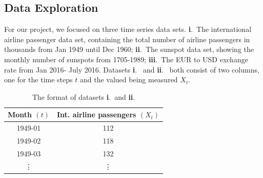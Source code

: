 \documentclass[10pt,a4paper]{article}
\begin{document}
\subsection{Data Exploration}
%
For our project, we focused on three time series data sets. {\bf i}.~The international airline passenger data set, containing the total number of airline passengers in thousands from Jan 1949 until Dec 1960; {\bf ii}.~The sunspot data set, showing the monthly number of sunspots from 1705-1989; {\bf iii}.~The EUR to USD exchange rate from Jan 2016- July 2016. Datasets {\bf i}.~ and {\bf ii}.~ both consist of two columns, one for the time steps $t$ and the valued being measured $X_t$. 

\begin{table}[h]
\centering
\begin{tabular}{ c c }
Month $(t)$ & Int. airline passengers $(X_t)$ \\ \hline
 1949-01 & 112 \\ 
 1949-02 & 118  \\  
 1949-03 & 132   \\
 \vdots & \vdots 
\end{tabular}
\caption{The format of datasets {\bf i}.~and {\bf ii}.}
\label{table: sample format of dataset i and ii}
\end{table}
\end{document}
